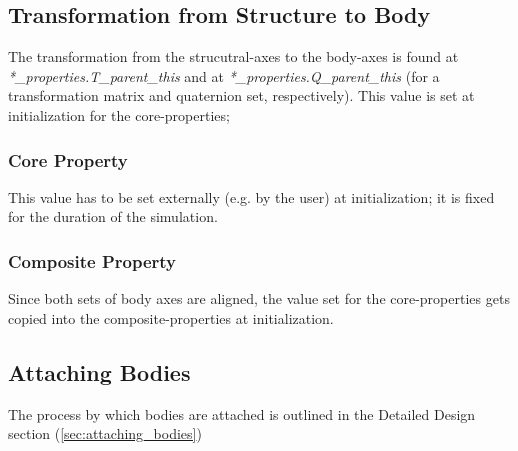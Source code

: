 \subsection{Transformation from Structure to Body}
The transformation from the strucutral-axes to the body-axes is found at 
\textit{*\_properties.T\_parent\_this} and at 
\textit{*\_properties.Q\_parent\_this} (for a transformation matrix and 
quaternion set, respectively).  This value is set at initialization for the 
core-properties; 

\subsubsection {Core Property}
This value has to be set externally (e.g. by the user) at initialization; it 
is fixed for the duration of the simulation.
\subsubsection {Composite Property}
Since both sets of body axes are aligned, the value set for the 
core-properties gets copied into the composite-properties at initialization. 

\subsection{Attaching Bodies}
The process by which bodies are attached is outlined in the Detailed Design 
section (\ref{sec:attaching_bodies})







